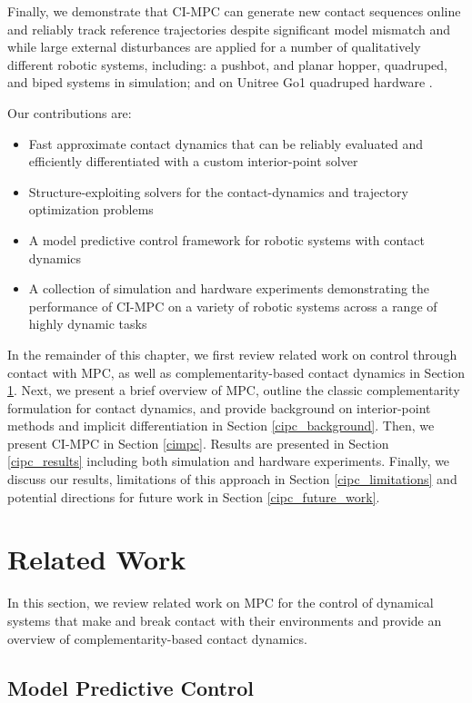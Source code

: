 Finally, we demonstrate that CI-MPC can generate new contact sequences online and reliably track reference trajectories despite significant model mismatch and while large external disturbances are applied for a number of qualitatively different robotic systems, including: a pushbot, and planar hopper, quadruped, and biped systems in simulation; and on Unitree Go1 quadruped hardware \cite{unitree_go1}.

Our contributions are:
\begin{itemize}
	\item Fast approximate contact dynamics that can be reliably evaluated and efficiently differentiated with a custom interior-point solver
	\item Structure-exploiting solvers for the contact-dynamics and trajectory optimization problems
	\item A model predictive control framework for robotic systems with contact dynamics
	\item A collection of simulation and hardware experiments demonstrating the performance of CI-MPC on a variety of robotic systems across a range of highly dynamic tasks
\end{itemize}

In the remainder of this chapter, we first review related work on control through contact with MPC, as well as complementarity-based contact dynamics in Section \ref{cipc_related_work}. Next, we present a brief overview of MPC, outline the classic complementarity formulation for contact dynamics, and provide background on interior-point methods and implicit differentiation in Section \ref{cipc_background}. Then, we present CI-MPC in Section \ref{cimpc}. Results are presented in Section \ref{cipc_results} including both simulation and hardware experiments. Finally, we discuss our results, limitations of this approach in Section \ref{cipc_limitations} and potential directions for future work in Section \ref{cipc_future_work}.

\section{Related Work} \label{cipc_related_work}
In this section, we review related work on MPC for the control of dynamical systems that make and break contact with their environments and provide an overview of complementarity-based contact dynamics.

\subsection{Model Predictive Control}

